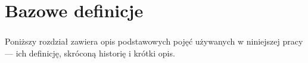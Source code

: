 \chapter{Bazowe definicje} \label{ch:bazowedefinicje}
\subsection*{} \noindent Poniższy rozdział zawiera opis podstawowych pojęć używanych w niniejszej pracy --- ich definicję, skróconą historię i krótki opis.





